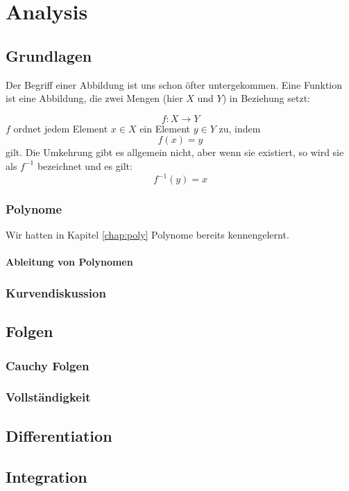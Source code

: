 \part{Analysis}


\chapter{Grundlagen}

Der Begriff einer Abbildung ist uns schon öfter untergekommen. Eine Funktion ist eine Abbildung, die zwei Mengen (hier $X$ und $Y$) in Beziehung setzt:

\[ f: X \longrightarrow Y \]
$f$ ordnet jedem Element $x\in X$ ein Element $y\in Y$ zu, indem
\[f(x) =y\]
gilt. Die Umkehrung gibt es allgemein nicht, aber wenn sie existiert, so wird sie als $f^{-1}$ bezeichnet und es gilt:
\[ f^{-1}(y) =x\]


\section{Polynome}

Wir hatten in Kapitel \ref{chap:poly} Polynome bereits kennengelernt. 

\subsection{Ableitung von Polynomen}



\section{Kurvendiskussion}



\chapter{Folgen}


\section{Cauchy Folgen}


\section{Vollständigkeit}



\chapter{Differentiation}



\chapter{Integration}


